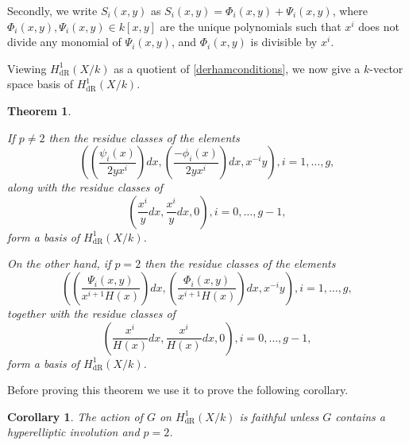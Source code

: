 \documentclass[draft, 11pt]{article} %
\theoremstyle{plain}
\newtheorem{thm}[defn]{Theorem}
\newtheorem{cor}[defn]{Corollary}
\theoremstyle{remark}
\newcommand{\derhamhone}{H_{\text {dR}}^1(X/k)}
\begin{document}
Secondly, we write $S_i(x,y)$ as $S_i(x,y) = \Phi_i(x,y) + \Psi_i(x,y)$, where $\Phi_i(x,y), \Psi_i(x,y) \in k[x,y]$ are the unique polynomials such that $x^i$ does not divide any monomial of $\Psi_i(x,y)$, and $\Phi_i(x,y)$ is divisible by $x^i$.

Viewing $\derhamhone$ as a quotient of \eqref{derhamconditions}, we now give a $k$-vector space basis of $\derhamhone$.
\begin{thm}\label{basis}

If $p \neq 2$ then the residue classes of the elements 
\begin{equation}\label{one}
 \left( \left( \frac{\psi_i(x)}{2yx^i}\right) dx, \left(\frac{-\phi_i(x)}{2yx^i}\right) dx, x^{-i}y\right), i=1, \ldots ,g,
\end{equation}
along with the residue classes of 
\begin{equation}\label{two}
 \left( \frac{x^{i}}{y} dx , \frac{x^{i}}{y} dx, 0 \right), i = 0,\ldots ,g-1,
\end{equation}
form a basis of $\derhamhone$.

On the other hand, if $p=2$ then the residue classes of the elements 
\begin{equation}\label{three}
\left( \left(\frac{\Psi_i(x,y)}{x^{i+1}H(x)}\right) dx, \left( \frac{\Phi_i(x,y)}{x^{i+1}H(x)} \right) dx, x^{-i}y \right), i =1, \ldots , g,
\end{equation}
together with the residue classes of 
\begin{equation}\label{four}
\left( \frac{x^{i}}{H(x)} dx, \frac{x^{i}}{H(x)} dx, 0 \right), i=0, \ldots, g-1,
\end{equation}
form a basis of $\derhamhone$.
\end{thm}

Before proving this theorem we use it to prove the following corollary.

\begin{cor}
The action of $G$ on $\derhamhone$ is faithful unless $G$ contains a hyperelliptic involution and $p=2$.
\end{cor}
\end{document}
